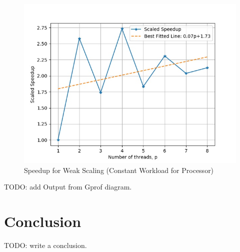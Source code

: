 \documentclass{article}
\begin{document}
\begin{figure}[h!]
	\centering
	\includegraphics[width=0.8\columnwidth]{../weak_scaling_v2.jpg}
	\caption{Speedup for Weak Scaling (Constant Workload for Processor)}
	\label{fig:weak_scaling_v2}
\end{figure}

TODO: add Output from Gprof diagram.

\section{Conclusion}

TODO: write a conclusion.
\end{document}
